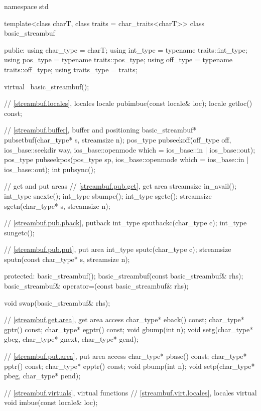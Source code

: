 %
\begin{codeblock}
namespace std {
  template<class charT, class traits = char_traits<charT>>
  class basic_streambuf {
  public:
    using char_type   = charT;
    using int_type    = typename traits::int_type;
    using pos_type    = typename traits::pos_type;
    using off_type    = typename traits::off_type;
    using traits_type = traits;

    virtual ~basic_streambuf();

    // \ref{streambuf.locales}, locales
    locale   pubimbue(const locale& loc);
    locale   getloc() const;

    // \ref{streambuf.buffer}, buffer and positioning
    basic_streambuf* pubsetbuf(char_type* s, streamsize n);
    pos_type pubseekoff(off_type off, ios_base::seekdir way,
                        ios_base::openmode which
                          = ios_base::in | ios_base::out);
    pos_type pubseekpos(pos_type sp,
                        ios_base::openmode which
                          = ios_base::in | ios_base::out);
    int      pubsync();

    // get and put areas
    // \ref{streambuf.pub.get}, get area
    streamsize in_avail();
    int_type snextc();
    int_type sbumpc();
    int_type sgetc();
    streamsize sgetn(char_type* s, streamsize n);

    // \ref{streambuf.pub.pback}, putback
    int_type sputbackc(char_type c);
    int_type sungetc();

    // \ref{streambuf.pub.put}, put area
    int_type   sputc(char_type c);
    streamsize sputn(const char_type* s, streamsize n);

  protected:
    basic_streambuf();
    basic_streambuf(const basic_streambuf& rhs);
    basic_streambuf& operator=(const basic_streambuf& rhs);

    void swap(basic_streambuf& rhs);

    // \ref{streambuf.get.area}, get area access
    char_type* eback() const;
    char_type* gptr()  const;
    char_type* egptr() const;
    void       gbump(int n);
    void       setg(char_type* gbeg, char_type* gnext, char_type* gend);

    // \ref{streambuf.put.area}, put area access
    char_type* pbase() const;
    char_type* pptr() const;
    char_type* epptr() const;
    void       pbump(int n);
    void       setp(char_type* pbeg, char_type* pend);

    // \ref{streambuf.virtuals}, virtual functions
    // \ref{streambuf.virt.locales}, locales
    virtual void imbue(const locale& loc);

}}
\end{codeblock}
